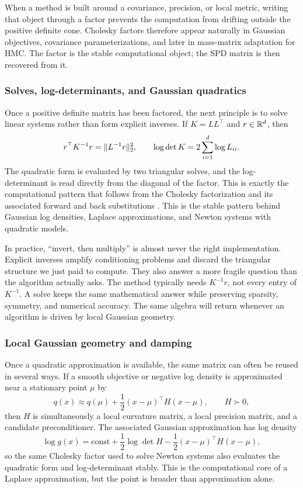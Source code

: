 When a method is built around a covariance, precision, or local metric, writing that object through a factor prevents the computation from drifting outside the positive definite cone.
Cholesky factors therefore appear naturally in Gaussian objectives, covariance parameterizations, and later in mass-matrix adaptation for HMC.
The factor is the stable computational object; the SPD matrix is then recovered from it.

\subsubsection{Solves, log-determinants, and Gaussian quadratics}
\label{subsubsec:solves-logdets}

Once a positive definite matrix has been factored, the next principle is to solve linear systems rather than form explicit inverses.
If $K=LL^\top$ and $r\in\mathbb{R}^d$, then
\begin{equation}
  r^\top K^{-1}r = \lVert L^{-1}r\rVert_2^2,
  \qquad
  \log\det K = 2\sum_{i=1}^d \log L_{ii}.
  \label{eq:cholesky-quadratic-logdet}
\end{equation}
The quadratic form is evaluated by two triangular solves, and the log-determinant is read directly from the diagonal of the factor.
This is exactly the computational pattern that follows from the Cholesky factorization and its associated forward and back substitutions \citep[Alg.~A.2]{nocedal_wright_2006_numerical}.
This is the stable pattern behind Gaussian log densities, Laplace approximations, and Newton systems with quadratic models.

In practice, ``invert, then multiply'' is almost never the right implementation.
Explicit inverses amplify conditioning problems and discard the triangular structure we just paid to compute.
They also answer a more fragile question than the algorithm actually asks.
The method typically needs $K^{-1}r$, not every entry of $K^{-1}$.
A solve keeps the same mathematical answer while preserving sparsity, symmetry, and numerical accuracy.
The same algebra will return whenever an algorithm is driven by local Gaussian geometry.

\subsubsection{Local Gaussian geometry and damping}
\label{subsubsec:local-gaussian-geometry}
Once a quadratic approximation is available, the same matrix can often be reused in several ways.
If a smooth objective or negative log density is approximated near a stationary point $\mu$ by
\[
  q(x)
  \approx
  q(\mu) + \frac{1}{2}(x-\mu)^\top H(x-\mu),
  \qquad H\succ 0,
\]
then $H$ is simultaneously a local curvature matrix, a local precision matrix, and a candidate preconditioner.
The associated Gaussian approximation has log density
\[
  \log g(x)
  =
  \text{const}
  +
  \frac{1}{2}\log\det H
  -
  \frac{1}{2}(x-\mu)^\top H(x-\mu),
\]
so the same Cholesky factor used to solve Newton systems also evaluates the quadratic form and log-determinant stably.
This is the computational core of a Laplace approximation, but the point is broader than approximation alone.

